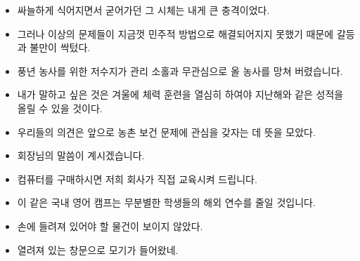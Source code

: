 \documentclass[10pt]{report}
\begin{document}
\begin{itemize}
\item
싸늘하게 식어지면서 굳어가던 그 시체는 내게 큰 충격이었다.

\item
그러나 이상의 문제들이 지금껏 민주적 방법으로 해결되어지지 못했기 때문에 갈등과 불만이 싹텄다.

\item
풍년 농사를 위한 저수지가 관리 소홀과 무관심으로 올 농사를 망쳐 버렸습니다.

\item
내가 말하고 싶은 것은 겨울에 체력 훈련을 열심히 하여야 지난해와 같은 성적을 올릴 수 있을 것이다.

\item
우리들의 의견은 앞으로 농촌 보건 문제에 관심을 갖자는 데 뜻을 모았다.

\item
회장님의 말씀이 계시겠습니다.

\item
컴퓨터를 구매하시면 저희 회사가 직접 교육시켜 드립니다.

\item
이 같은 국내 영어 캠프는 무분별한 학생들의 해외 연수를 줄일 것입니다.

\item
손에 들려져 있어야 할 물건이 보이지 않았다.

\item
열려져 있는 창문으로 모기가 들어왔네.

\end{itemize}

\tableofcontents
\listoftables
\end{document}
